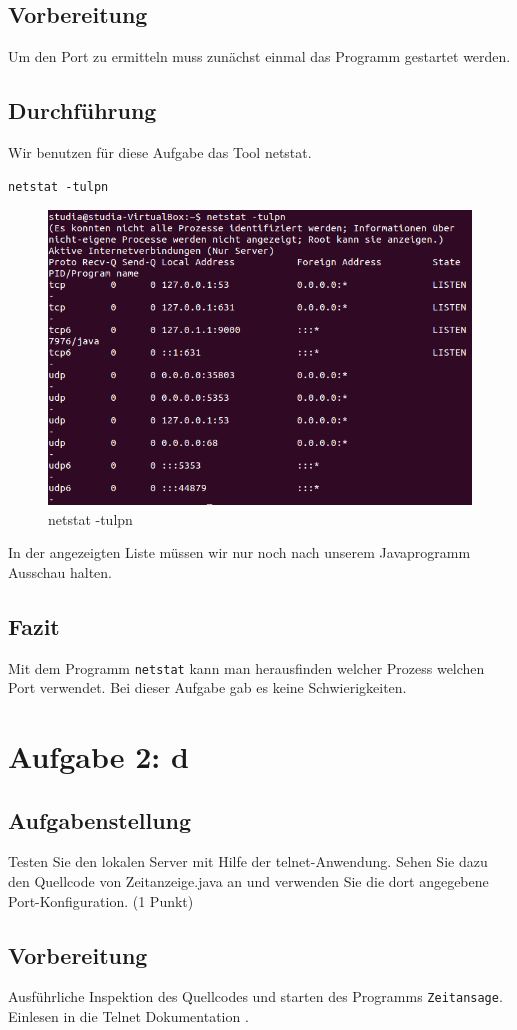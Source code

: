 \subsection{Vorbereitung}
Um den Port zu ermitteln muss zunächst einmal das Programm gestartet werden.

\subsection{Durchführung}
Wir benutzen für diese Aufgabe das Tool netstat.
\begin{lstlisting}
netstat -tulpn
\end{lstlisting}

\begin{figure}[H]
	\centering
	\includegraphics[width=0.4 \linewidth]{images/15}
	\caption{netstat -tulpn}
\end{figure}
In der angezeigten Liste müssen wir nur noch nach unserem Javaprogramm Ausschau halten.

\subsection{Fazit}
Mit dem Programm \texttt{netstat} kann man herausfinden welcher Prozess welchen Port verwendet. Bei dieser Aufgabe gab es keine Schwierigkeiten.

\section{Aufgabe 2: d}

\subsection{Aufgabenstellung}
Testen Sie den lokalen Server mit Hilfe der telnet-Anwendung. Sehen Sie dazu den Quellcode von Zeitanzeige.java an und verwenden Sie die dort angegebene Port-Konfiguration. (1 Punkt)

\subsection{Vorbereitung}
Ausführliche Inspektion des Quellcodes und starten des Programms \texttt{Zeitansage}.
Einlesen in die Telnet Dokumentation \cite{telnet:commands}.

